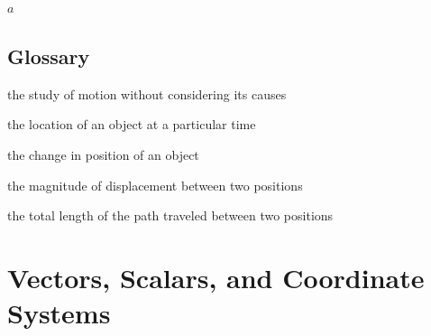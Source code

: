 \documentclass[
]{book}
\providecommand{\tightlist}{%
  \setlength{\itemsep}{0pt}\setlength{\parskip}{0pt}}
\begin{document}
\leavevmode{}%
\(a\)

\hypertarget{glossary}{%
\subsection{Glossary}\label{glossary}}

\begin{description}
\tightlist
\item[kinematics]
the study of motion without considering its causes
\end{description}

\begin{description}
\tightlist
\item[position]
the location of an object at a particular time
\end{description}

\begin{description}
\tightlist
\item[displacement]
the change in position of an object
\end{description}

\begin{description}
\tightlist
\item[distance]
the magnitude of displacement between two positions
\end{description}

\begin{description}
\tightlist
\item[distance traveled]
the total length of the path traveled between two positions
\end{description}

\hypertarget{vectors-scalars-and-coordinate-systems}{%
\section{Vectors, Scalars, and Coordinate Systems}\label{vectors-scalars-and-coordinate-systems}}
\end{document}
